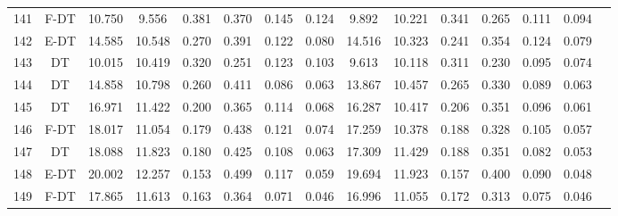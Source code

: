 \begin{longtable}{@{\hskip3pt}c@{\hskip3pt}c@{\hskip3pt}c@{\hskip3pt}c@{\hskip3pt}c@{\hskip3pt}c@{\hskip3pt}c@{\hskip3pt}c@{\hskip3pt}c@{\hskip3pt}c@{\hskip3pt}c@{\hskip3pt}c@{\hskip3pt}c@{\hskip3pt}c@{\hskip3pt}c}
        141 &           F-DT &            10.750 &       9.556 &         0.381 &       0.370 &       0.145 &        0.124 &               9.892 &      10.221 &         0.341 &       0.265 &       0.111 &        0.094 \\
        142 &           E-DT &            14.585 &      10.548 &         0.270 &       0.391 &       0.122 &        0.080 &              14.516 &      10.323 &         0.241 &       0.354 &       0.124 &        0.079 \\
        143 &             DT &            10.015 &      10.419 &         0.320 &       0.251 &       0.123 &        0.103 &               9.613 &      10.118 &         0.311 &       0.230 &       0.095 &        0.074 \\
        144 &             DT &            14.858 &      10.798 &         0.260 &       0.411 &       0.086 &        0.063 &              13.867 &      10.457 &         0.265 &       0.330 &       0.089 &        0.063 \\
        145 &             DT &            16.971 &      11.422 &         0.200 &       0.365 &       0.114 &        0.068 &              16.287 &      10.417 &         0.206 &       0.351 &       0.096 &        0.061 \\
        146 &           F-DT &            18.017 &      11.054 &         0.179 &       0.438 &       0.121 &        0.074 &              17.259 &      10.378 &         0.188 &       0.328 &       0.105 &        0.057 \\
        147 &             DT &            18.088 &      11.823 &         0.180 &       0.425 &       0.108 &        0.063 &              17.309 &      11.429 &         0.188 &       0.351 &       0.082 &        0.053 \\
        148 &           E-DT &            20.002 &      12.257 &         0.153 &       0.499 &       0.117 &        0.059 &              19.694 &      11.923 &         0.157 &       0.400 &       0.090 &        0.048 \\
        149 &           F-DT &            17.865 &      11.613 &         0.163 &       0.364 &       0.071 &        0.046 &              16.996 &      11.055 &         0.172 &       0.313 &       0.075 &        0.046 \\
\end{longtable}
